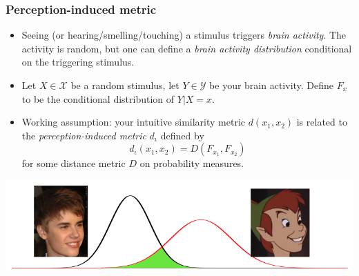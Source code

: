 \documentclass{beamer}
\begin{document}
\begin{frame}
\frametitle{Perception-induced metric}
\begin{itemize}
\item Seeing (or hearing/smelling/touching) a stimulus triggers \emph{brain activity}.  The activity is random, but one can define a \emph{brain activity distribution} conditional on the triggering stimulus.
\item Let $X \in \mathcal{X}$ be a random stimulus, let $Y \in \mathcal{Y}$ be your brain activity.  Define $F_x$ to be the conditional distribution of $Y|X=x$.
\item Working assumption: your intuitive similarity metric $d(x_1,x_2)$ is related to the \emph{perception-induced metric} $d_\iota$ defined by
\[
d_\iota(x_1,x_2) = D(F_{x_1}, F_{x_2})
\]
for some distance metric $D$ on probability measures.
\end{itemize}
\begin{center}
\includegraphics[scale = .12]{similarity.png}
\end{center}
\end{frame}
\end{document}
